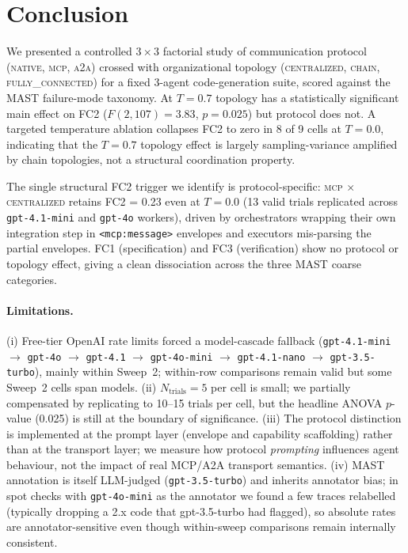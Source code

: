 \section{Conclusion}

We presented a controlled $3 \times 3$ factorial study of communication
protocol (\textsc{native}, \textsc{mcp}, \textsc{a2a}) crossed with
organizational topology (\textsc{centralized}, \textsc{chain},
\textsc{fully\_connected}) for a fixed 3-agent code-generation suite,
scored against the MAST failure-mode taxonomy. At $T = 0.7$ topology has
a statistically significant main effect on FC2 ($F(2,107) = 3.83$,
$p = 0.025$) but protocol does not. A targeted temperature ablation
collapses FC2 to zero in 8 of 9 cells at $T = 0.0$, indicating that the
$T = 0.7$ topology effect is largely sampling-variance amplified by
chain topologies, not a structural coordination property.

The single structural FC2 trigger we identify is protocol-specific:
\textsc{mcp} $\times$ \textsc{centralized} retains FC2 = 0.23 even at
$T = 0.0$ (13 valid trials replicated across \texttt{gpt-4.1-mini} and
\texttt{gpt-4o} workers), driven by orchestrators wrapping their own
integration step in \texttt{<mcp:message>} envelopes and executors
mis-parsing the partial envelopes. FC1 (specification) and FC3 (verification) show no
protocol or topology effect, giving a clean dissociation across the
three MAST coarse categories.

\paragraph{Limitations.}
(i) Free-tier OpenAI rate limits forced a model-cascade fallback
(\texttt{gpt-4.1-mini} $\to$ \texttt{gpt-4o} $\to$ \texttt{gpt-4.1} $\to$
\texttt{gpt-4o-mini} $\to$ \texttt{gpt-4.1-nano} $\to$ \texttt{gpt-3.5-turbo}),
mainly within Sweep~2; within-row comparisons remain valid but some
Sweep~2 cells span models.
(ii) $N_{\text{trials}} = 5$ per cell is small; we partially compensated
by replicating to 10--15 trials per cell, but the headline ANOVA
$p$-value (0.025) is still at the boundary of significance.
(iii) The protocol distinction is implemented at the prompt layer
(envelope and capability scaffolding) rather than at the transport
layer; we measure how protocol \emph{prompting} influences agent
behaviour, not the impact of real MCP/A2A transport semantics.
(iv) MAST annotation is itself LLM-judged (\texttt{gpt-3.5-turbo}) and
inherits annotator bias; in spot checks with \texttt{gpt-4o-mini} as
the annotator we found a few traces relabelled (typically dropping a
2.x code that gpt-3.5-turbo had flagged), so absolute rates are
annotator-sensitive even though within-sweep comparisons remain
internally consistent.

